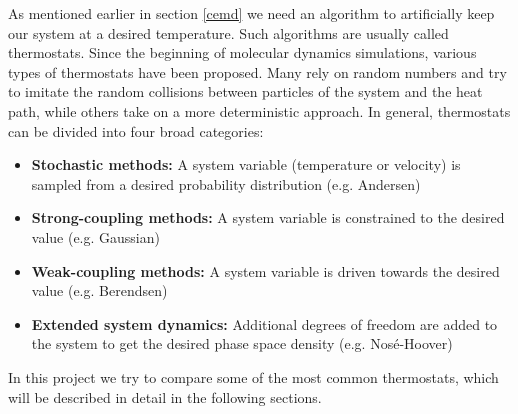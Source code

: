 As mentioned earlier in section \ref{cemd} we need an algorithm to artificially keep our system at a desired temperature. Such algorithms are usually called thermostats. Since the beginning of molecular dynamics simulations, various types of thermostats have been proposed. Many rely on random numbers and try to imitate the random collisions between particles of the system and the heat path, while others take on a more deterministic approach. In general, thermostats can be divided into four broad categories: 
\begin{itemize}
\item \textbf{Stochastic methods:} A system variable (temperature or velocity) is sampled from a desired probability distribution (e.g. Andersen)
\item \textbf{Strong-coupling methods:} A system variable is constrained to the desired value (e.g. Gaussian) 
\item \textbf{Weak-coupling methods:} A system variable is driven towards the desired value (e.g. Berendsen) 
\item \textbf{Extended system dynamics:} Additional degrees of freedom are added to the system to get the desired phase space density (e.g. Nosé-Hoover) 
\end{itemize}  
In this project we try to compare some of the most common thermostats, which will be described in detail in the following sections. 

